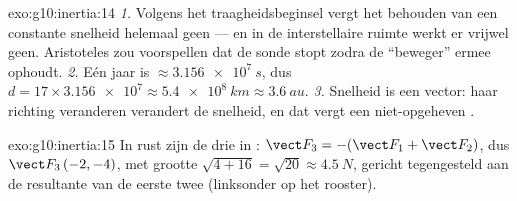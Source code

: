 \begin{solution}{exo:g10:inertia:14}
\emph{1.} Volgens het traagheidsbeginsel vergt het behouden van een
constante snelheid helemaal geen  --- en in de interstellaire
ruimte werkt er vrijwel geen. Aristoteles zou voorspellen dat de sonde
stopt zodra de ``beweger'' ermee ophoudt. \emph{2.} Eén jaar is
$\approx \qty{3.156e7}{s}$, dus
$d = 17 \times \num{3.156e7} \approx \qty{5.4e8}{km} \approx
\qty{3.6}{au}$. \emph{3.} Snelheid is een vector: haar richting
veranderen verandert de snelheid, en dat vergt een niet-opgeheven
.
\end{solution}

\begin{solution}{exo:g10:inertia:15}
In rust zijn de drie  in :
$\vect F_3 = -(\vect F_1 + \vect F_2)$, dus $\vect F_3\,(-2, -4)$, met
grootte $\sqrt{4 + 16} = \sqrt{20} \approx \qty{4.5}{N}$, gericht
tegengesteld aan de resultante van de eerste twee (linksonder op het
rooster).
\end{solution}

